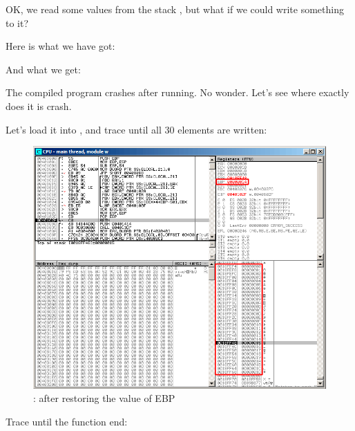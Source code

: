 
OK, we read some values from the stack , but what if we could write something to it?

Here is what we have got:




And what we get:



The compiled program crashes after running. No wonder. Let's see where exactly does it is crash.

\clearpage
\myindex{\olly}

Let's load it into \olly, and trace until all 30 elements are written:

\begin{figure}[H]
\centering
\includegraphics[scale=\FigScale]{patterns/13_arrays/2_BO/olly_w1.png}
\caption{\olly: after restoring the value of EBP}
\label{fig:array_BO_olly_w1}
\end{figure}

\clearpage
Trace until the function end:

